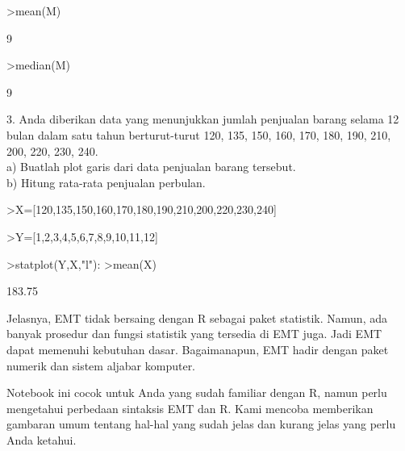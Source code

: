 \documentclass[a4paper,10pt]{article}
\begin{document}
\begin{eulernotebook}
\begin{eulercomment}
\begin{eulercomment}
\begin{eulercomment}
\begin{eulercomment}
\begin{eulercomment}
\begin{eulercomment}
\begin{eulercomment}
\begin{eulercomment}
\begin{eulerprompt}
>mean(M)
\end{eulerprompt}
\begin{euleroutput}
  9
\end{euleroutput}
\begin{eulerprompt}
>median(M)
\end{eulerprompt}
\begin{euleroutput}
  9
\end{euleroutput}
\begin{eulercomment}
3. Anda diberikan data yang menunjukkan jumlah penjualan barang selama
12 bulan dalam satu tahun berturut-turut 120, 135, 150, 160, 170, 180,
190, 210, 200, 220, 230, 240.\\
a) Buatlah plot garis dari data penjualan barang tersebut.\\
b) Hitung rata-rata penjualan perbulan.
\end{eulercomment}
\begin{eulerprompt}
>X=[120,135,150,160,170,180,190,210,200,220,230,240]
\end{eulerprompt}
\begin{euleroutput}
  [120,  135,  150,  160,  170,  180,  190,  210,  200,  220,  230,  240]
\end{euleroutput}
\begin{eulerprompt}
>Y=[1,2,3,4,5,6,7,8,9,10,11,12]
\end{eulerprompt}
\begin{euleroutput}
  [1,  2,  3,  4,  5,  6,  7,  8,  9,  10,  11,  12]
\end{euleroutput}
\begin{eulerprompt}
>statplot(Y,X,"l"):
>mean(X)
\end{eulerprompt}
\begin{euleroutput}
  183.75
\end{euleroutput}
\begin{eulercomment}
\begin{eulercomment}
\begin{eulercomment}
Jelasnya, EMT tidak bersaing dengan R sebagai paket statistik. Namun,
ada banyak prosedur dan fungsi statistik yang tersedia di EMT juga.
Jadi EMT dapat memenuhi kebutuhan dasar. Bagaimanapun, EMT hadir
dengan paket numerik dan sistem aljabar komputer.

Notebook ini cocok untuk Anda yang sudah familiar dengan R, namun
perlu mengetahui perbedaan sintaksis EMT dan R. Kami mencoba
memberikan gambaran umum tentang hal-hal yang sudah jelas dan kurang
jelas yang perlu Anda ketahui.


\end{eulercomment}
\end{eulercomment}
\end{eulercomment}
\end{eulercomment}
\end{eulercomment}
\end{eulercomment}
\end{eulercomment}
\end{eulercomment}
\end{eulercomment}
\end{eulercomment}
\end{eulercomment}
\end{eulernotebook}
\end{document}
